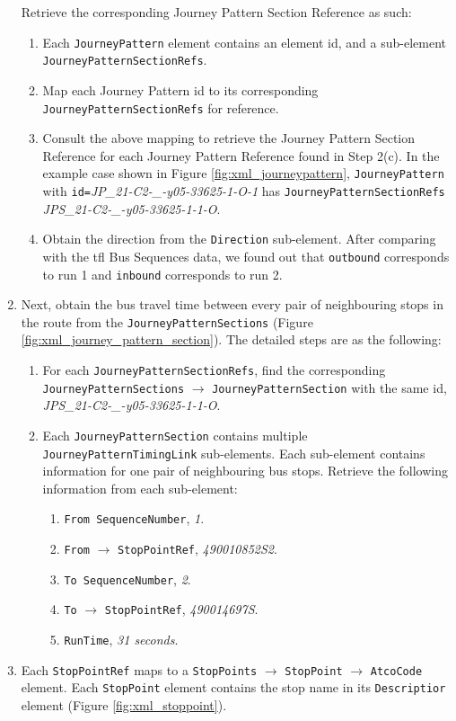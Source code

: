 \begin{enumerate}
  Retrieve the corresponding Journey Pattern Section Reference as such:
    \begin{enumerate}
      \item Each \texttt{JourneyPattern} element contains an element id, and a sub-element \texttt{JourneyPatternSectionRefs}.
      \item Map each Journey Pattern id to its corresponding \\ \texttt{JourneyPatternSectionRefs} for reference.
      \item Consult the above mapping to retrieve the Journey Pattern Section Reference for each Journey Pattern Reference found in Step 2(c). In the example case shown in Figure \ref{fig:xml_journeypattern}, \texttt{JourneyPattern} with \texttt{id=}\textit{JP\_21-C2-\_-y05-33625-1-O-1} has \texttt{JourneyPatternSectionRefs} \textit{JPS\_21-C2-\_-y05-33625-1-1-O}.
      \item Obtain the direction from the \texttt{Direction} sub-element. After comparing with the \acrshort{tfl} Bus Sequences data, we found out that \texttt{outbound} corresponds to run 1 and \texttt{inbound} corresponds to run 2.
    \end{enumerate}
    \item Next, obtain the bus travel time between every pair of neighbouring stops in the route from the \texttt{JourneyPatternSections} (Figure \ref{fig:xml_journey_pattern_section}). The detailed steps are as the following:
    \begin{enumerate}
      \item For each \texttt{JourneyPatternSectionRefs}, find the corresponding \texttt{JourneyPatternSections} $\rightarrow$ \texttt{JourneyPatternSection} with the same id, \textit{JPS\_21-C2-\_-y05-33625-1-1-O}.
      \item Each \texttt{JourneyPatternSection} contains multiple \\ \texttt{JourneyPatternTimingLink} sub-elements. Each sub-element contains information for one pair of neighbouring bus stops. Retrieve the following information from each sub-element:
      \begin{enumerate}
        \item \texttt{From SequenceNumber}, \textit{1}.
        \item \texttt{From} $\rightarrow$ \texttt{StopPointRef}, \textit{490010852S2}.
        \item \texttt{To SequenceNumber}, \textit{2}.
        \item \texttt{To} $\rightarrow$ \texttt{StopPointRef}, \textit{490014697S}.
        \item \texttt{RunTime}, \textit{31 seconds}.
      \end{enumerate}
    \end{enumerate}
    \item Each \texttt{StopPointRef} maps to a \texttt{StopPoints} $\rightarrow$ \texttt{StopPoint} $\rightarrow$ \texttt{AtcoCode} element. Each \texttt{StopPoint} element contains the stop name in its \texttt{Descriptior} element (Figure \ref{fig:xml_stoppoint}).


\end{enumerate}
